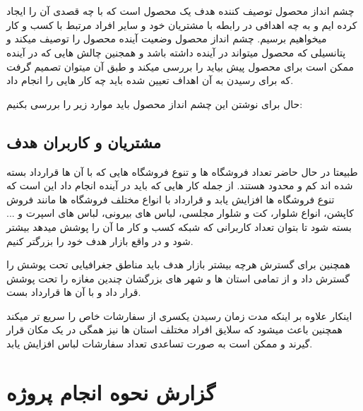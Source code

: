 \documentclass[12pt,a4paper]{article}
\begin{document}
\maketitle
\pagebreak
\tableofcontents
\pagebreak
\normalsize	
\section{} \label{section.productVision}


چشم انداز محصول توصیف کننده هدف یک محصول است که با چه قصدی آن را ایجاد کرده ایم و به چه اهدافی در رابطه با مشتریان خود و سایر افراد مرتبط با کسب و کار میخواهیم برسیم. چشم انداز محصول وضعیت آینده محصول را توصیف میکند و پتانسیلی که محصول میتواند در آینده داشته باشد و همجنین چالش هایی که در آینده ممکن است برای محصول پیش بیاید را بررسی میکند و طبق آن میتوان تصمیم گرفت که برای رسیدن به آن اهداف تعیین شده باید چه کار هایی را انجام داد.	
	
	
حال برای نوشتن این چشم انداز محصول باید موارد زیر را بررسی بکنیم:

	
\subsection{\textbf{مشتریان و کاربران هدف}} \label{section.productVision.customers}


طبیعتا در حال حاضر تعداد فروشگاه ها و تنوع فروشگاه هایی که با آن ها قرارداد بسته شده اند کم و محدود هستند. از جمله کار هایی که باید در آینده انجام داد این است که تنوع فروشگاه ها افزایش یابد و قرارداد با انواع مختلف فروشگاه ها مانند فروش کاپشن، انواع شلوار، کت و شلوار مجلسی، لباس های بیرونی، لباس های اسپرت و ... بسته شود تا بتوان تعداد کاربرانی که شبکه کسب و کار ما آن را پوشش میدهد بیشتر شود و در واقع بازار هدف خود را بزرگتر کنیم.


همچنین برای گسترش هرچه بیشتر بازار هدف باید مناطق جغرافیایی تحت پوشش را گسترش داد و از تمامی استان ها و شهر های بزرگشان چندین مغازه را تحت پوشش قرار داد و با آن ها قرارداد بست.


اینکار علاوه بر اینکه مدت زمان رسیدن یکسری از سفارشات خاص را سریع تر میکند همچنین باعث میشود که سلایق افراد مختلف استان ها نیز همگی در یک مکان قرار گیرند و ممکن است به صورت تساعدی تعداد سفارشات لباس افزایش یابد.



\pagebreak

\section{\textbf{گزارش نحوه انجام پروژه}} \label{section.report}
\end{document}
